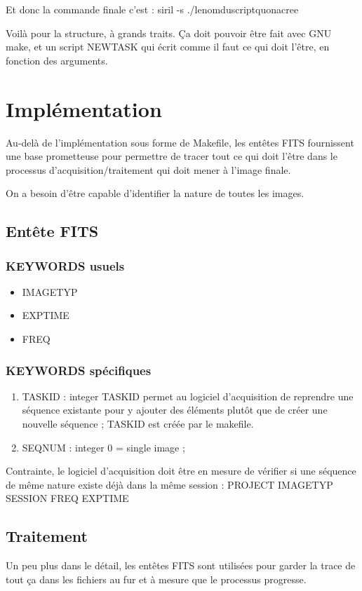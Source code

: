 \documentclass[10pt,a4paper,french]{article}
\newcommand{\bi}{\begin{itemize}}
\newcommand{\ei}{\end{itemize}}
\newcommand{\be}{\begin{enumerate}}
\newcommand{\ee}{\end{enumerate}}
\begin{document}
Et donc la commande finale c'est : siril -s ./lenomduscriptquonacree

Voilà pour la structure, à grands traits. Ça doit pouvoir être fait avec 
GNU make, et un script NEWTASK qui écrit comme il faut ce qui doit l'être,
en fonction des arguments.

\section{Implémentation}
Au-delà de l'implémentation sous forme de Makefile, les entêtes FITS
fournissent une base prometteuse pour permettre de tracer tout ce qui doit
l'être dans le processus d'acquisition/traitement qui doit mener à l'image finale.

On a besoin d'être capable d'identifier la nature de toutes les images.

\subsection{Entête FITS}
\subsubsection{KEYWORDS usuels}
\bi
\item IMAGETYP
\item EXPTIME
\item FREQ
\ei
\subsubsection{KEYWORDS spécifiques}
\be
\item TASKID : integer
TASKID permet au logiciel d'acquisition de reprendre une séquence existante pour
y ajouter des éléments plutôt que de créer une nouvelle séquence ; TASKID
est créée par le makefile.

\item SEQNUM : integer    0 = single image ; 
\ee
Contrainte, le logiciel d'acquisition doit être en mesure 
de vérifier si une séquence de même nature existe déjà dans 
la même session :
PROJECT IMAGETYP SESSION FREQ EXPTIME 

\subsection{Traitement}

Un peu plus dans le détail, les entêtes FITS sont utilisées pour garder
la trace de tout ça dans les fichiers au fur et à mesure que le processus 
progresse.

\end{document}
